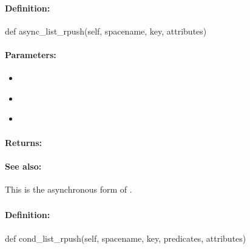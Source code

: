 \paragraph{Definition:}
\begin{pythoncode}
def async_list_rpush(self, spacename, key, attributes)
\end{pythoncode}

\paragraph{Parameters:}
\begin{itemize}[noitemsep]
\item {}\\

\item {}\\

\item {}\\

\end{itemize}

\paragraph{Returns:}


\paragraph{See also:}  This is the asynchronous form of .

\pagebreak
\subsubsection{}
\label{api:python:cond_list_rpush}


\paragraph{Definition:}
\begin{pythoncode}
def cond_list_rpush(self, spacename, key, predicates, attributes)
\end{pythoncode}

